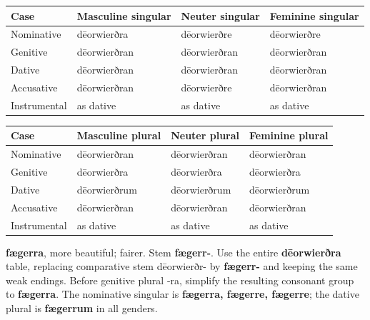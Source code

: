 \par\begingroup
\fontsize{10.5}{13.2}\selectfont
\setlength{\LTleft}{0pt}\setlength{\LTright}{\fill}
\noindent
\begin{tabular}{@{}>{\raggedright\arraybackslash}p{22.0mm}>{\raggedright\arraybackslash}p{31.188mm}>{\raggedright\arraybackslash}p{31.188mm}>{\raggedright\arraybackslash}p{31.188mm}@{}}
\toprule
\textbf{Case} & \textbf{Masculine singular} & \textbf{Neuter singular} & \textbf{Feminine singular} \\
\midrule
Nominative & dēorwierðra & dēorwierðre & dēorwierðre \\
Genitive & dēorwierðran & dēorwierðran & dēorwierðran \\
Dative & dēorwierðran & dēorwierðran & dēorwierðran \\
Accusative & dēorwierðran & dēorwierðre & dēorwierðran \\
Instrumental & as dative & as dative & as dative \\
\bottomrule
\end{tabular}
\par\endgroup
\par\addvspace{5pt}
\par\begingroup
\fontsize{10.5}{13.2}\selectfont
\setlength{\LTleft}{0pt}\setlength{\LTright}{\fill}
\noindent
\begin{tabular}{@{}>{\raggedright\arraybackslash}p{22.0mm}>{\raggedright\arraybackslash}p{31.188mm}>{\raggedright\arraybackslash}p{31.188mm}>{\raggedright\arraybackslash}p{31.188mm}@{}}
\toprule
\textbf{Case} & \textbf{Masculine plural} & \textbf{Neuter plural} & \textbf{Feminine plural} \\
\midrule
Nominative & dēorwierðran & dēorwierðran & dēorwierðran \\
Genitive & dēorwierðra & dēorwierðra & dēorwierðra \\
Dative & dēorwierðrum & dēorwierðrum & dēorwierðrum \\
Accusative & dēorwierðran & dēorwierðran & dēorwierðran \\
Instrumental & as dative & as dative & as dative \\
\bottomrule
\end{tabular}
\par\endgroup

\textbf{fægerra}, more beautiful; fairer. Stem \textbf{fægerr-}. Use the entire \textbf{dēorwierðra} table, replacing comparative stem dēorwierðr- by \textbf{fægerr-} and keeping the same weak endings. Before genitive plural -ra, simplify the resulting consonant group to \textbf{fægerra}. The nominative singular is \textbf{fægerra, fægerre, fægerre}; the dative plural is \textbf{fægerrum} in all genders.

